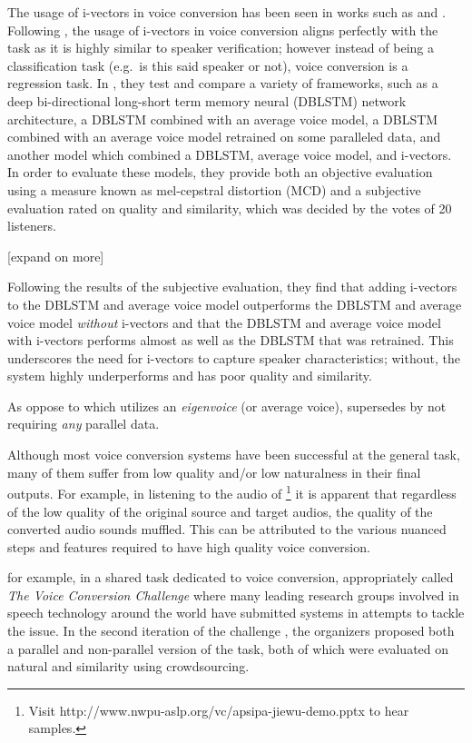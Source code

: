 \documentclass
[
    a4paper,
    twoside,
    12pt
]
{report}
\begin{document}
The usage of i-vectors in voice conversion has been seen in works such
as \textcite{wu2016} and \textcite{kinnunen2017}. Following
\textcite{kinnunen2017}, the usage of i-vectors in voice conversion
aligns perfectly with the task as it is highly similar to speaker
verification; however instead of being a classification task (e.g.~is
this said speaker or not), voice conversion is a regression task. In
\textcite{wu2016}, they test and compare a variety of frameworks, such
as a deep bi-directional long-short term memory neural (DBLSTM) network
architecture, a DBLSTM combined with an average voice model, a DBLSTM
combined with an average voice model retrained on some paralleled data,
and another model which combined a DBLSTM, average voice model, and
i-vectors. In order to evaluate these models, they provide both an
objective evaluation using a measure known as mel-cepstral distortion
(MCD) and a subjective evaluation rated on quality and similarity, which
was decided by the votes of 20 listeners.

{[}expand on \textcite{wu2016} more{]}

Following the results of the subjective evaluation, they find that
adding i-vectors to the DBLSTM and average voice model outperforms the
DBLSTM and average voice model \emph{without} i-vectors and that the
DBLSTM and average voice model with i-vectors performs almost as well as
the DBLSTM that was retrained. This underscores the need for i-vectors
to capture speaker characteristics; without, the system highly
underperforms and has poor quality and similarity.

As oppose to \textcite{wu2016} which utilizes an \emph{eigenvoice} (or
average voice), \textcite{kinnunen2017} supersedes \textcite{wu2016} by
not requiring \emph{any} parallel data.

Although most voice conversion systems have been successful at the
general task, many of them suffer from low quality and/or low
naturalness in their final outputs. For example, in listening to the
audio of
\textcite{wu2016}\footnote{Visit http://www.nwpu-aslp.org/vc/apsipa-jiewu-demo.pptx to hear samples.}
it is apparent that regardless of the low quality of the original source
and target audios, the quality of the converted audio sounds muffled.
This can be attributed to the various nuanced steps and features
required to have high quality voice conversion.

for example, in a shared task dedicated to voice conversion,
appropriately called \emph{The Voice Conversion Challenge} where many
leading research groups involved in speech technology around the world
have submitted systems in attempts to tackle the issue. In the second
iteration of the challenge \textcite{lorenzo-trueba2018}, the organizers
proposed both a parallel and non-parallel version of the task, both of
which were evaluated on natural and similarity using crowdsourcing.
\end{document}
